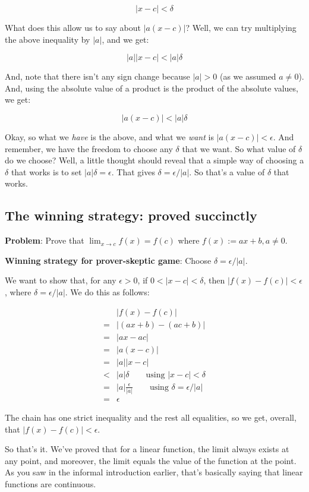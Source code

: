 \documentclass[10pt]{amsart}
\begin{document}
$$|x - c| < \delta$$

What does this allow us to say about $|a(x - c)|$? Well, we can try
multiplying the above inequality by $|a|$, and we get:

$$|a| |x - c| < |a|\delta$$

And, note that there isn't any sign change because $|a| > 0$ (as we
assumed $a \ne 0$). And, using the absolute value of a product is the
product of the absolute values, we get:

$$|a(x - c)| < |a|\delta$$

Okay, so what we {\em have} is the above, and what we {\em want} is
$|a(x - c)| < \epsilon$. And remember, we have the freedom to choose
any $\delta$ that we want. So what value of $\delta$ do we choose?
Well, a little thought should reveal that a simple way of choosing a
$\delta$ that works is to set $|a|\delta = \epsilon$. That gives
$\delta = \epsilon/|a|$. So that's a value of $\delta$ that works.

\subsection{The winning strategy: proved succinctly}

{\bf Problem}: Prove that $\lim_{x \to c} f(x) = f(c)$ where $f(x) :=
ax + b, a \ne 0$.

{\bf Winning strategy for prover-skeptic game}: Choose $\delta =
\epsilon/|a|$.

We want to show that, for any $\epsilon > 0$, if $0 < |x - c| <
\delta$, then $|f(x) - f(c)| < \epsilon$, where $\delta =
\epsilon/|a|$. We do this as follows:

\begin{align*}
  & |f(x) - f(c)|\\
= & |(ax + b) - (ac + b)| \\
= & |ax - ac| \\
= & |a(x - c)| \\
= & |a||x - c| \\
< & |a|\delta \qquad \text{using $|x - c| < \delta$}\\
= & |a|\frac{\epsilon}{|a|} \qquad \text{using $\delta = \epsilon/|a|$}\\
= & \epsilon
\end{align*}

The chain has one strict inequality and the rest all equalities, so we
get, overall, that $|f(x) - f(c)| < \epsilon$.

So that's it. We've proved that for a linear function, the limit
always exists at any point, and moreover, the limit equals the value
of the function at the point. As you saw in the informal introduction
earlier, that's basically saying that linear functions are continuous.
\end{document}
